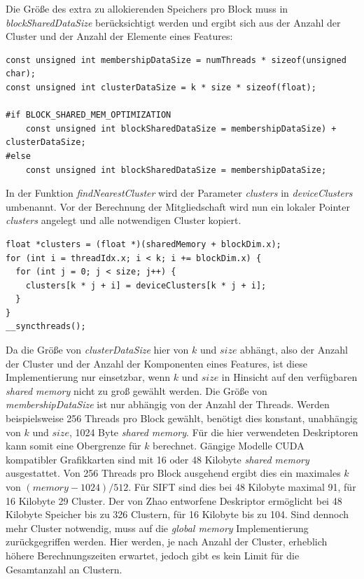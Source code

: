 Die Größe des extra zu allokierenden Speichers pro Block muss in \textit{blockSharedDataSize} berücksichtigt werden und ergibt sich aus der Anzahl der Cluster und der Anzahl der Elemente eines Features:

\lstset{language=C}
\begin{lstlisting}
const unsigned int membershipDataSize = numThreads * sizeof(unsigned char);
const unsigned int clusterDataSize = k * size * sizeof(float);

#if BLOCK_SHARED_MEM_OPTIMIZATION
    const unsigned int blockSharedDataSize = membershipDataSize) + clusterDataSize;
#else
	const unsigned int blockSharedDataSize = membershipDataSize;
\end{lstlisting}

In der Funktion \textit{findNearestCluster} wird der Parameter \textit{clusters} in \textit{deviceClusters} umbenannt. Vor der Berechnung der Mitgliedschaft wird nun ein lokaler Pointer \textit{clusters} angelegt und alle notwendigen Cluster kopiert.

\lstset{language=C}
\begin{lstlisting}
float *clusters = (float *)(sharedMemory + blockDim.x);
for (int i = threadIdx.x; i < k; i += blockDim.x) {
  for (int j = 0; j < size; j++) {
    clusters[k * j + i] = deviceClusters[k * j + i];
  }
}
__syncthreads();
\end{lstlisting}

Da die Größe von \textit{clusterDataSize} hier von $k$ und $size$ abhängt, also der Anzahl der Cluster und der Anzahl der Komponenten eines Features, ist diese Implementierung nur einsetzbar, wenn $k$ und $size$ in Hinsicht auf den verfügbaren \textit{shared memory} nicht zu groß gewählt werden. Die Größe von \textit{membershipDataSize} ist nur abhängig von der Anzahl der Threads. Werden beispielsweise 256 Threads pro Block gewählt, benötigt dies konstant, unabhängig von $k$ und $size$, 1024 Byte \textit{shared memory}. Für die hier verwendeten Deskriptoren kann somit eine Obergrenze für $k$ berechnet. Gängige Modelle CUDA kompatibler Grafikkarten sind mit 16 oder 48 Kilobyte \textit{shared memory} ausgestattet. Von 256 Threads pro Block ausgehend ergibt dies ein maximales $k$ von $(memory - 1024) / 512$. Für SIFT sind dies bei 48 Kilobyte maximal 91, für 16 Kilobyte 29 Cluster. Der von Zhao entworfene Deskriptor ermöglicht bei 48 Kilobyte Speicher bis zu 326 Clustern, für 16 Kilobyte bis zu 104. Sind dennoch mehr Cluster notwendig, muss auf die \textit{global memory} Implementierung zurückgegriffen werden. Hier werden, je nach Anzahl der Cluster, erheblich höhere Berechnungszeiten erwartet, jedoch gibt es kein Limit für die Gesamtanzahl an Clustern.